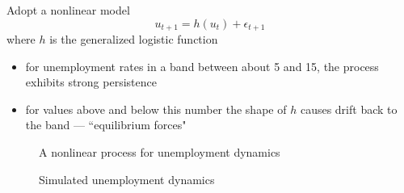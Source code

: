\begin{frame}

    \vspace{2em}
    Adopt a nonlinear model
    \begin{equation}
        \label{eq:unempnl}
        u_{t+1} = h(u_t) + \epsilon_{t+1}
    \end{equation}
    where $h$ is the generalized logistic function
    
    \begin{itemize}
        \item  for unemployment rates in a band between about
                5 and 15, the process exhibits strong persistence
        \item  for values above and below this number the shape of $h$ causes              drift back to the band --- ``equilibrium forces"
    \end{itemize} 
    
\end{frame}

\begin{frame}

    \begin{figure}
    \centering
    \caption{\label{f:glu} A nonlinear process for unemployment dynamics}
    \end{figure}

\end{frame}

\begin{frame}

    \begin{figure}
    \centering
    \caption{\label{f:unempl_sim} Simulated unemployment dynamics}
    \end{figure}
    
\end{frame}

